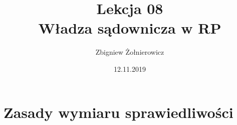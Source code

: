 \documentclass[a4paper]{article}
\begin{document}
\title{{\huge Lekcja 08} \\
{\large Władza sądownicza w RP}}
\author{Zbigniew Żołnierowicz}
\date{12.11.2019}
\maketitle
\section{Zasady wymiaru sprawiedliwości}
\end{document}
